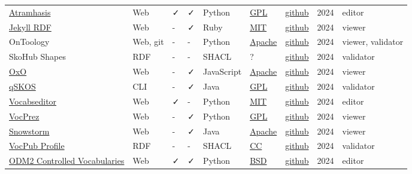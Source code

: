 \documentclass[
  DIV=10]{article}
\begin{document}
\begin{longtable}[]{@{}lllllllll@{}}
\href{https://atramhasis.readthedocs.io/en/latest/}{Atramhasis} & Web &
✓ & ✓ & Python & \href{https://spdx.org/licenses/GPL-3.0-or-later}{GPL}
& \href{https://github.com/OnroerendErfgoed/atramhasis}{github} & 2024 &
editor \\
\href{https://github.com/AKSW/jekyll-rdf}{Jekyll RDF} & Web & - & ✓ &
Ruby & \href{https://spdx.org/licenses/MIT}{MIT} &
\href{https://github.com/AKSW/jekyll-rdf}{github} & 2024 & viewer \\
OnToology & Web, git & - & - & Python &
\href{https://spdx.org/licenses/Apache-2.0}{Apache} &
\href{https://github.com/OnToology/OnToology}{github} & 2024 & viewer,
validator \\
SkoHub Shapes & RDF & - & - & SHACL & ? &
\href{https://github.com/skohub-io/skohub-shapes}{github} & 2024 &
validator \\
\href{https://www.ebi.ac.uk/spot/oxo/}{OxO} & Web & - & ✓ & JavaScript &
\href{https://spdx.org/licenses/Apache-2.0}{Apache} &
\href{https://github.com/EBISPOT/OXO}{github} & 2024 & viewer \\
\href{https://github.com/cmader/qSKOS/}{qSKOS} & CLI & - & ✓ & Java &
\href{https://spdx.org/licenses/GPL-3.0-or-later}{GPL} &
\href{https://github.com/cmader/qSKOS/}{github} & 2024 & validator \\
\href{https://vocabseditor.acdh.oeaw.ac.at/}{Vocabseditor} & Web & ✓ & -
& Python & \href{https://spdx.org/licenses/MIT}{MIT} &
\href{https://github.com/acdh-oeaw/vocabseditor}{github} & 2024 &
editor \\
\href{https://github.com/RDFLib/VocPrez}{VocPrez} & Web & - & ✓ & Python
& \href{https://spdx.org/licenses/GPL-3.0-or-later}{GPL} &
\href{https://github.com/RDFLib/VocPrez}{github} & 2024 & viewer \\
\href{https://github.com/IHTSDO/snowstorm}{Snowstorm} & Web & - & ✓ &
Java & \href{https://spdx.org/licenses/Apache-2.0}{Apache} &
\href{https://github.com/IHTSDO/snowstorm}{github} & 2024 & viewer \\
\href{https://surroundaustralia.github.io/vocpub-profile/profile.html}{VocPub
Profile} & RDF & - & - & SHACL &
\href{https://spdx.org/licenses/CC-BY-4.0}{CC} &
\href{https://github.com/AGLDWG/vocpub-profile/}{github} & 2024 &
validator \\
\href{http://vocabulary.odm2.org/}{ODM2 Controlled Vocabularies} & Web &
✓ & ✓ & Python & \href{https://spdx.org/licenses/BSD-3-Clause}{BSD} &
\href{https://github.com/ODM2/ODM2ControlledVocabularies}{github} & 2024
& editor \\

\end{longtable}
\end{document}
